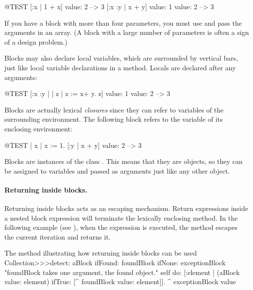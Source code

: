 \documentclass[a4paper,10pt,twoside]{book}
\begin{document}
\begin{code}{@TEST}
[:x | 1 + x] value: 2 --> 3
[:x :y | x + y] value: 1 value: 2 --> 3
\end{code}

If you have a block with more than four parameters, you must use  and pass the arguments in an array.
(A block with a large number of parameters is often a sign of a design problem.)

Blocks may also declare local variables, which are surrounded by vertical bars, just like local variable declarations in a method.
Locals are declared after any arguments:

\begin{code}{@TEST}
[:x :y | | z | z := x+ y. z] value: 1 value: 2 --> 3
\end{code}

Blocks are actually lexical \emph{closures} since they can refer to variables of the surrounding environment.
The following block refers to the variable  of its enclosing environment:

\begin{code}{@TEST}
| x |
x := 1.
[:y | x + y] value: 2 --> 3
\end{code}

Blocks are instances of the class .
This means that they are objects, so they can be assigned to variables and passed as arguments just like any other object.

\paragraph{Returning inside blocks.}
Returning inside blocks acts as an escaping mechanism. 
Return expressions inside a nested block expression will terminate the lexically enclosing method.
In the following example (see ), when the expression  is executed, the method  escapes the current iteration and returns it. 

\begin{method}[detectReturnBlock]{The method  illustrating how returning inside blocks can be used}
Collection>>>detect: aBlock ifFound: foundBlock ifNone: exceptionBlock 
   "foundBlock takes one argument, the found object."
   self do: [:element | 
      (aBlock value: element) ifTrue: [^ foundBlock value: element]].
   ^ exceptionBlock value
\end{method}
\end{document}
